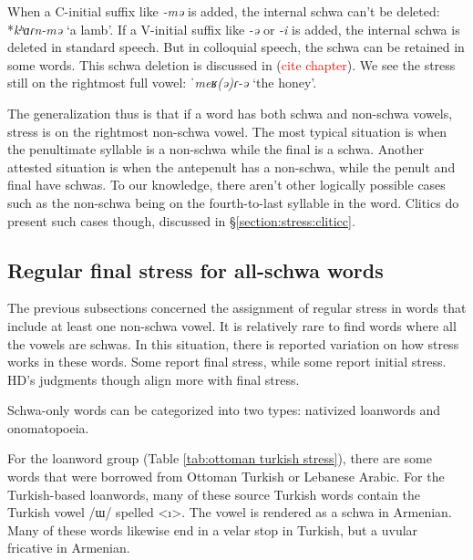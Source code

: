 When a C-initial suffix like \textit{-mə} is added,  the internal schwa can't be deleted: *\textit{kʰɑɾn-mə} `a lamb'. If a V-initial suffix like   \textit{-ə} or   \textit{-i} is added, the internal schwa is deleted in standard speech. But in colloquial speech, the schwa can be retained in some words. This schwa deletion is discussed in (\textcolor{red}{cite chapter}).  We see the stress still on the rightmost full vowel: \textit{ˈmeʁ(ə)ɾ-ə} `the honey'. 


The generalization thus is that if a word has both schwa and non-schwa vowels, stress is on the rightmost non-schwa vowel. The most typical situation is when the penultimate syllable is a non-schwa while the final is a schwa. Another attested situation is when the antepenult has a non-schwa, while the penult and final have schwas.  To our knowledge, there aren't other logically possible cases such as the non-schwa being on the fourth-to-last syllable in the word. Clitics do present such cases though, discussed in \S\ref{section:stress:cliticc}. 

\subsection{Regular final stress for all-schwa words}\label{section:stress:regular:schwaword} 
The previous subsections concerned the assignment of regular stress in words that include at least one non-schwa vowel. It is relatively rare to find words where all the vowels are schwas. In this situation, there is reported variation on how stress works in these words. Some report final stress, while some report initial stress. HD's judgments though align more with final stress. 


Schwa-only words can be categorized into two types: nativized loanwords and onomatopoeia. 

For the loanword group (Table \ref{tab:ottoman turkish stress}), there are some words that were borrowed from Ottoman Turkish or Lebanese Arabic. For the Turkish-based loanwords, many    of these source Turkish words contain the Turkish vowel /ɯ/ spelled <ı>. The vowel is rendered as a schwa in Armenian. Many of these words likewise end in a velar stop in Turkish, but a uvular fricative in Armenian.


